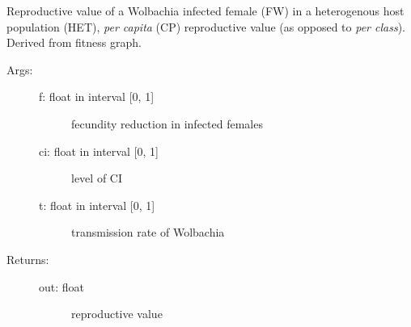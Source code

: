 \documentclass[letterpaper,10pt,english]{sphinxmanual}
\begin{document}
\begin{fulllineitems}
\label{index:wspec.analytical.reproval_FWHETCP}
Reproductive value of a Wolbachia infected female (FW) in a 
heterogenous host population (HET), \emph{per capita} (CP) reproductive 
value (as opposed to \emph{per class}). Derived from fitness graph.
\begin{description}
\item[{Args:}] \leavevmode\begin{description}
\item[{f: float in interval {[}0, 1{]}}] \leavevmode
fecundity reduction in infected females

\item[{ci: float in interval {[}0, 1{]}}] \leavevmode
level of CI

\item[{t: float in interval {[}0, 1{]}}] \leavevmode
transmission rate of Wolbachia

\end{description}

\item[{Returns:}] \leavevmode\begin{description}
\item[{out: float}] \leavevmode
reproductive value

\end{description}

\end{description}

\end{fulllineitems}

\end{document}
